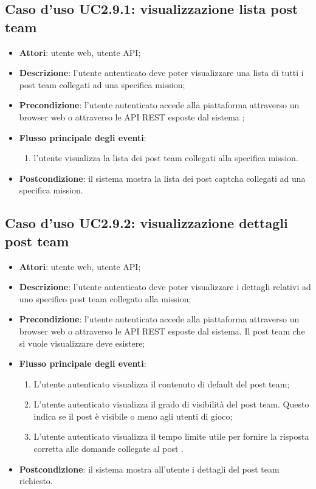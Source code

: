 \subsection{Caso d'uso UC2.9.1: visualizzazione lista post team}
\begin{itemize}
\item \textbf{Attori}: utente web, utente API;
\item \textbf{Descrizione}: l'utente autenticato deve poter visualizzare una lista di tutti i post team collegati ad una specifica mission; 
      \item \textbf{Precondizione}: l'utente autenticato accede alla piattaforma attraverso un browser web o attraverso le API REST esposte dal sistema
;

        \item \textbf{Flusso principale degli eventi}:
          \begin{enumerate}
          \item l'utente visualizza la lista dei post team collegati alla specifica mission.

      \end{enumerate}
    \item \textbf{Postcondizione}: il sistema mostra la lista dei post captcha collegati ad una specifica mission.
  \end{itemize}
\hypertarget{UC2.9.2}{}
\subsection{Caso d'uso UC2.9.2: visualizzazione dettagli post team}
\begin{itemize}
\item \textbf{Attori}: utente web, utente API;
\item \textbf{Descrizione}: l'utente autenticato deve poter visualizzare i dettagli relativi ad uno specifico post team collegato alla mission; 
      \item \textbf{Precondizione}: l'utente autenticato accede alla piattaforma attraverso un browser web o attraverso le API REST esposte dal sistema. Il post team che si vuole visualizzare deve esistere;

        \item \textbf{Flusso principale degli eventi}:
          \begin{enumerate}
          \item L'utente autenticato visualizza il contenuto di default del post team;
          \item L'utente autenticato visualizza il grado di visibilità del post team. Questo indica se il post è visibile o meno agli utenti di gioco;
          \item L'utente autenticato visualizza il tempo limite utile per fornire la risposta corretta alle domande collegate al post .

      \end{enumerate}
    \item \textbf{Postcondizione}: il sistema mostra all'utente i dettagli del post team richiesto.
  \end{itemize}
\hypertarget{UC2.9.3}{}
